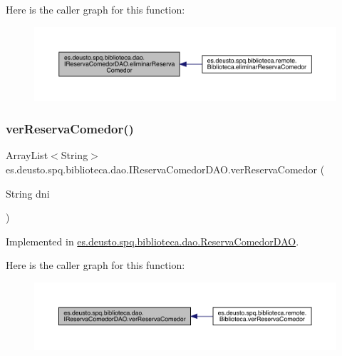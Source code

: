 Here is the caller graph for this function\+:
\nopagebreak
\begin{figure}[H]
\begin{center}
\leavevmode
\includegraphics[width=350pt]{interfacees_1_1deusto_1_1spq_1_1biblioteca_1_1dao_1_1_i_reserva_comedor_d_a_o_ab135ff48fa3d6c4ea1c4bf78405b96f4_icgraph}
\end{center}
\end{figure}
\mbox{\label{interfacees_1_1deusto_1_1spq_1_1biblioteca_1_1dao_1_1_i_reserva_comedor_d_a_o_ae20ad98f69700d0c47c0cb274e1f0e33}} 
\subsubsection{\texorpdfstring{ver\+Reserva\+Comedor()}{verReservaComedor()}}
{\footnotesize\ttfamily Array\+List$<$String$>$ es.\+deusto.\+spq.\+biblioteca.\+dao.\+I\+Reserva\+Comedor\+D\+A\+O.\+ver\+Reserva\+Comedor (\begin{DoxyParamCaption}\item[{String}]{dni }\end{DoxyParamCaption})}



Implemented in \mbox{\hyperlink{classes_1_1deusto_1_1spq_1_1biblioteca_1_1dao_1_1_reserva_comedor_d_a_o_a4cac22c7d393f3994118317472f9ab95}{es.\+deusto.\+spq.\+biblioteca.\+dao.\+Reserva\+Comedor\+D\+AO}}.

Here is the caller graph for this function\+:
\nopagebreak
\begin{figure}[H]
\begin{center}
\leavevmode
\includegraphics[width=350pt]{interfacees_1_1deusto_1_1spq_1_1biblioteca_1_1dao_1_1_i_reserva_comedor_d_a_o_ae20ad98f69700d0c47c0cb274e1f0e33_icgraph}
\end{center}
\end{figure}


